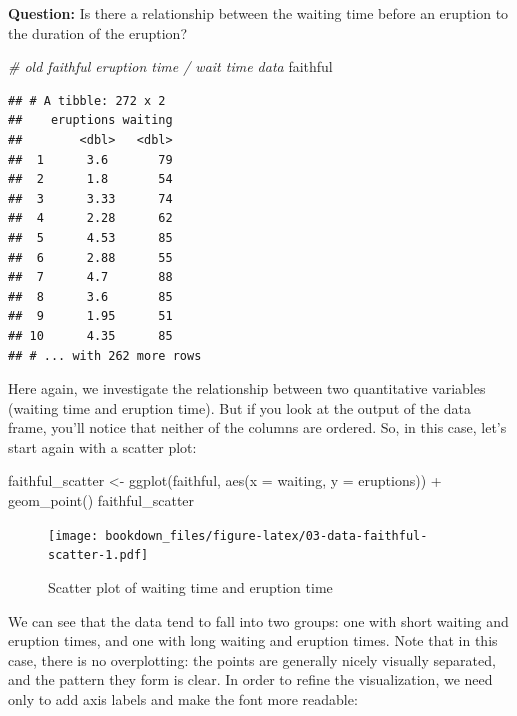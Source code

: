 \documentclass[
]{krantz}
\makeatletter
\newenvironment{Shaded}{\begin{snugshade}}{\end{snugshade}}
\newcommand{\AttributeTok}[1]{\textcolor[rgb]{0.61,0.61,0.61}{#1}}
\newcommand{\CommentTok}[1]{\textcolor[rgb]{0.37,0.37,0.37}{\textit{#1}}}
\newcommand{\FunctionTok}[1]{\textcolor[rgb]{0,0,0}{#1}}
\newcommand{\NormalTok}[1]{#1}
\newcommand{\OtherTok}[1]{\textcolor[rgb]{0.37,0.37,0.37}{#1}}
\newcommand{\SpecialCharTok}[1]{\textcolor[rgb]{0,0,0}{#1}}
\newenvironment{kframe}{%
\medskip{}
\setlength{\fboxsep}{.8em}
 \def\at@end@of@kframe{}%
 \ifinner\ifhmode%
  \def\at@end@of@kframe{\end{minipage}}%
  \begin{minipage}{\columnwidth}%
 \fi\fi%
 \def\FrameCommand##1{\hskip\@totalleftmargin \hskip-\fboxsep
 \colorbox{shadecolor}{##1}\hskip-\fboxsep
     \hskip-\linewidth \hskip-\@totalleftmargin \hskip\columnwidth}%
 \MakeFramed {\advance\hsize-\width
   \@totalleftmargin\z@ \linewidth\hsize
   \@setminipage}}%
 {\par\unskip\endMakeFramed%
 \at@end@of@kframe}
\renewenvironment{Shaded}{\begin{kframe}}{\end{kframe}}
\makeatother
\begin{document}
\textbf{Question:} Is there a relationship between the waiting time before an eruption to the duration of the eruption?

\begin{Shaded}
\begin{Highlighting}[]
\CommentTok{\# old faithful eruption time / wait time data}
\NormalTok{faithful}
\end{Highlighting}
\end{Shaded}

\begin{verbatim}
## # A tibble: 272 x 2
##    eruptions waiting
##        <dbl>   <dbl>
##  1      3.6       79
##  2      1.8       54
##  3      3.33      74
##  4      2.28      62
##  5      4.53      85
##  6      2.88      55
##  7      4.7       88
##  8      3.6       85
##  9      1.95      51
## 10      4.35      85
## # ... with 262 more rows
\end{verbatim}

Here again, we investigate the relationship between two quantitative variables (waiting time and eruption time). But if you look at the output of the data frame, you'll notice that neither of the columns are ordered. So, in this case, let's start again with a scatter plot:

\begin{Shaded}
\begin{Highlighting}[]
\NormalTok{faithful\_scatter }\OtherTok{\textless{}{-}} \FunctionTok{ggplot}\NormalTok{(faithful, }\FunctionTok{aes}\NormalTok{(}\AttributeTok{x =}\NormalTok{ waiting, }\AttributeTok{y =}\NormalTok{ eruptions)) }\SpecialCharTok{+}
  \FunctionTok{geom\_point}\NormalTok{()}
\NormalTok{faithful\_scatter}
\end{Highlighting}
\end{Shaded}

\begin{figure}
\centering
\texttt{[image: bookdown\_files/figure-latex/03-data-faithful-scatter-1.pdf]}
\caption{\label{fig:03-data-faithful-scatter}Scatter plot of waiting time and eruption time}
\end{figure}

We can see that the data tend to fall into two groups: one with short waiting and eruption times, and one with long waiting and eruption
times. Note that in this case, there is no overplotting: the points are generally nicely visually separated, and the pattern they form is clear.
In order to refine the visualization, we need only to add axis labels and make the font more readable:
\end{document}
